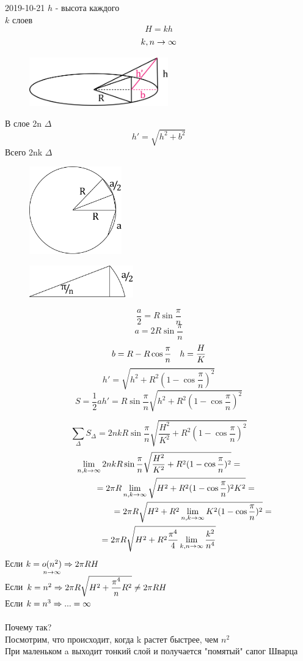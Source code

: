 \documentclass[main]{subfiles}
\begin{document}
\begin{lect} {2019-10-21}
		$h$ - высота каждого\\
		$k$ слоев
		\[H = k h\]
		\[k,n \rightarrow \infty\]
		\begin{figure}[H]
			\centering
			\includegraphics[width=6cm]{pics/7_3.png}
		\end{figure}
		В слое 2n $\Delta$
		\[h'=\sqrt{h^2 + b^2}\]
		Всего 2nk $\Delta$
		\begin{figure}[H]
			\centering
			\includegraphics[width=4cm]{pics/7_4.png}
		\end{figure}
		\begin{figure}[H]
			\centering
			\includegraphics[width=4.5cm]{pics/7_5.png}
		\end{figure}
		\[\dfrac{a}{2} = R \sin \dfrac{\pi}{n}\]
		\[a = 2 R \sin \dfrac{\pi}{n}\]
		\[b = R - R \cos \dfrac{\pi}{n} \quad h = \dfrac{H}{K}\]
		\[h' = \sqrt{h^2 + R^2 (1-\cos \dfrac{\pi}{n})^2}\]
		\[S = \dfrac{1}{2} a h' = R \sin \dfrac{\pi}{n} \sqrt{h^2 + R^2 (1-\cos \dfrac{\pi}{n})^2}\]

		\[\sum_{\Delta} S_{\Delta} = 2nk R \sin \dfrac{\pi}{n} \sqrt{\dfrac{H^2}{K^2} + R^2 (1-\cos \dfrac{\pi}{n})^2}\]
		\begin{multline*}
			\lim_{n,k \rightarrow \infty} 2nk R \sin \dfrac{\pi}{n} \sqrt{\dfrac{H^2}{K^2} + R^2 (1-\cos \dfrac{\pi}{n})^2} = \\
			\qquad \qquad = 2 \pi R \lim_{n,k \rightarrow \infty} \sqrt{H^2 + R^2 (1-\cos \dfrac{\pi}{n})^2 K^2} = \\
			\qquad \qquad \qquad \qquad = 2 \pi R \sqrt{H^2 + R^2 \lim_{n,k \rightarrow \infty} K^2 (1-\cos \dfrac{\pi}{n})^2} = \\
			= 2\pi R \sqrt{H^2 + R^2 \dfrac{\pi^4}{4} \lim_{k,n \rightarrow \infty} \dfrac{k^2}{n^4}}
		\end{multline*}
		Если $k=\underset{n \rightarrow \infty}{o(n^2)} \Rightarrow 2\pi RH$\\
		Если $k = n^2 \Rightarrow 2 \pi R \sqrt{H^2 + \dfrac{\pi^4}{n} R^2} \neq 2\pi R H$\\
		Если $k = n^3 \Rightarrow ... = \infty$\\ \\
		Почему так? \\
		Посмотрим, что происходит, когда k растет быстрее, чем $n^2$\\
		При маленьком a выходит тонкий слой и получается "помятый"{} сапог Шварца


\end{lect}
\end{document}

